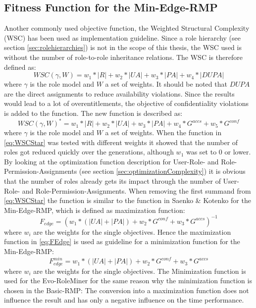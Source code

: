 		\subsection{Fitness Function for the Min-Edge-RMP}
		Another commonly used objective function, the Weighted Structural Complexity (WSC)\cite{Molloy}\cite{Xu} has been used as implementation guideline. Since a role hierarchy (see section \ref{sec:rolehierarchies}) is not in the scope of this thesis, the WSC used is without the number of role-to-role inheritance relations. The WSC is therefore defined as:
		\begin{equation}
			WSC(\gamma,W) = w_1 * |R| + w_2 * |UA| + w_3 * |PA| + w_4 * |DUPA|
		\end{equation}
		where $\gamma$ is the role model and $W$ a set of weights. It should be noted that $DUPA$ are the direct assignments to reduce availability violations. Since the results would lead to a lot of overentitlements, the objective of confidentiality violations is added to the function. The new function is described as:		
		\begin{equation}\label{eq:WSCStar}
			WSC(\gamma,W)^* = w_1 * |R| + w_2 * |UA| + w_3 * |PA| + w_4 * G^{accs} + w_5 * G^{conf}			
		\end{equation}		
		where $\gamma$ is the role model and $W$ a set of weights. When the function in \eqref{eq:WSCStar} was tested with different weights it showed that the number of roles got reduced quickly over the generations, although $w_1$ was set to 0 or lower. By looking at the optimization function description for User-Role- and Role-Permission-Assignments (see section \ref{sec:optimizationComplexity}) it is obvious that the number of roles already gets its impact through the number of User-Role- and Role-Permission-Assignments. When removing the first summand from \eqref{eq:WSCStar} the function is similar to the function in Saenko \& Kotenko\cite{Igor} for the Min-Edge-RMP, which is defined as maximization function:		
		\begin{equation}\label{eq:FEdge}
			F_{edge} = (w_1 * (|UA| + |PA|) + w_2 * G^{conf} + w_3 * G^{accs})^{-1}
		\end{equation}		
		where $w_i$ are the weights for the single objectives. Hence the maximization function in \eqref{eq:FEdge} is used as guideline for a minimization function for the Min-Edge-RMP:		
		\begin{equation}\label{eq:FEdgeMin}
			F_{edge}^{min} = w_1 * (|UA| + |PA|) + w_2 * G^{conf} + w_3 * G^{accs}
		\end{equation}		
		where $w_i$ are the weights for the single objectives. The Minimization function is used for the Evo-RoleMiner for the same reason why the minimization function is chosen in the Basic-RMP: The conversion into a maximization function does not influence the result and has only a negative influence on the time performance.
		
